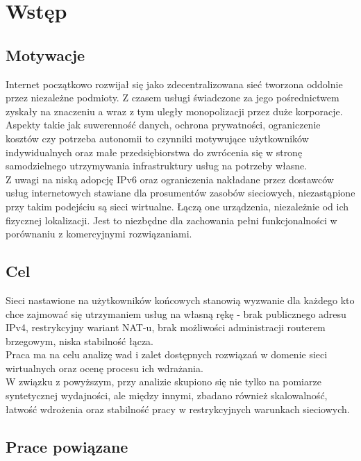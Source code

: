 \section{Wstęp}

\subsection{Motywacje}

Internet początkowo rozwijał się jako zdecentralizowana sieć tworzona oddolnie przez niezależne podmioty. Z czasem usługi świadczone za jego pośrednictwem zyskały na znaczeniu a wraz z tym uległy monopolizacji przez duże korporacje.\\

Aspekty takie jak suwerenność danych, ochrona prywatności, ograniczenie kosztów czy potrzeba autonomii to czynniki motywujące użytkowników indywidualnych oraz małe przedsiębiorstwa do zwrócenia się w stronę samodzielnego utrzymywania infrastruktury usług na potrzeby własne.\\

Z uwagi na niską adopcję IPv6 oraz ograniczenia nakładane przez dostawców usług internetowych stawiane dla prosumentów zasobów sieciowych, niezastąpione przy takim podejściu są sieci wirtualne. Łączą one urządzenia, niezależnie od ich fizycznej lokalizacji. Jest to niezbędne dla zachowania pełni funkcjonalności w porównaniu z komercyjnymi rozwiązaniami.

\subsection{Cel}

Sieci nastawione na użytkowników końcowych stanowią wyzwanie dla każdego kto chce zajmować się utrzymaniem usług na własną rękę - brak publicznego adresu IPv4, restrykcyjny wariant NAT-u, brak możliwości administracji routerem brzegowym, niska stabilność łącza.\\

Praca ma na celu analizę wad i zalet dostępnych rozwiązań w domenie sieci wirtualnych oraz ocenę procesu ich wdrażania.\\

W związku z powyższym, przy analizie skupiono się nie tylko na pomiarze syntetycznej wydajności, ale między innymi, zbadano również skalowalność, łatwość wdrożenia oraz stabilność pracy w restrykcyjnych warunkach sieciowych.

\newpage

\subsection{Prace powiązane}

